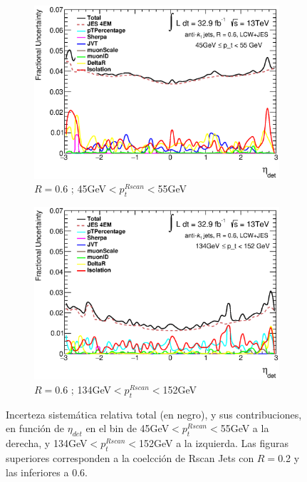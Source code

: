 \begin{figure}[ht]
\begin{subfigure}[b]{0.495\textwidth}
        \centering
        \includegraphics[width=\textwidth]{images/SumIn2_pT_4_6LC_wContributions.eps}
        \caption{$R=$0.6 ; 45GeV$<p_t^{Rscan}<$55GeV}
    \end{subfigure}
    \hfill
    \begin{subfigure}[b]{0.495\textwidth}
        \centering
        \includegraphics[width=\textwidth]{images/SumIn2_pT_10_6LC_wContributions.eps}
        \caption{$R=$0.6 ; 134GeV$<p^{Rscan}_t<$152GeV}
    \end{subfigure}
    \caption{ Incerteza sistemática relativa total (en negro), y sus contribuciones, en función de $\eta_{det}$ en el bin de 45GeV$<p_t^{Rscan}<$55GeV a la derecha, y 134GeV$<p^{Rscan}_t<$152GeV a la izquierda. Las figuras superiores corresponden a la coelcción de Rscan Jets con $R=$0.2 y las inferiores a 0.6.} 
    \label{fig:UnvsEta}
\end{figure}

